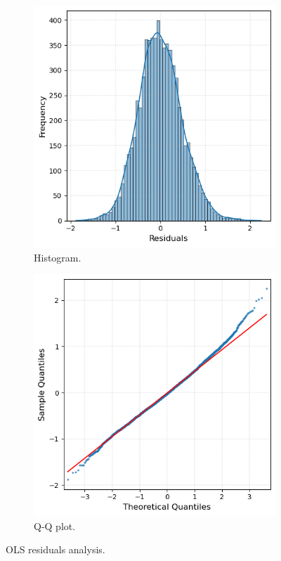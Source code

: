 \begin{figure}[!ht]
\centering
\begin{subfigure}{.45\textwidth}
  \centering
  \includegraphics[width=1\linewidth]{ucl-latex-thesis-templates-master/Image/resi_OLS_1.1.png}
  \caption{Histogram.}
  \label{fig:A4.61}
\end{subfigure}%
\begin{subfigure}{.45\textwidth}
  \centering
  \includegraphics[width=1\linewidth]{ucl-latex-thesis-templates-master/Image/resi_OLS_1.2.png}
  \caption{Q-Q plot.}
  \label{fig:A4.62}
\end{subfigure}
\caption{OLS residuals analysis.}
\label{fig:A4.6}
\end{figure}

